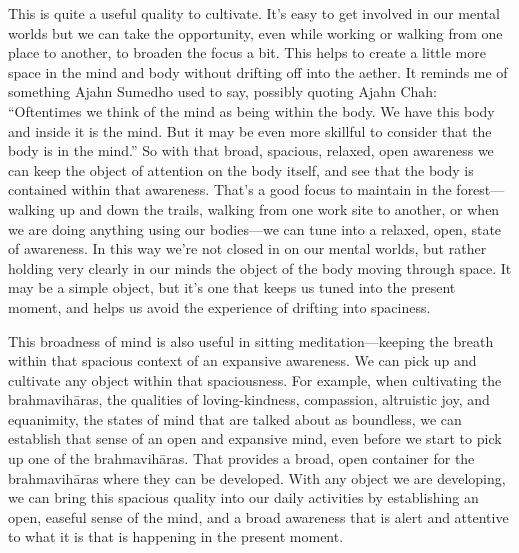 This is quite a useful quality to cultivate. It's easy to get involved 
in our mental worlds but we can take the opportunity, even while 
working or walking from one place to another, to broaden the focus a 
bit. This helps to create a little more space in the mind and body 
without drifting off into the aether. It reminds me of something Ajahn 
Sumedho used to say, possibly quoting Ajahn Chah: ``Oftentimes we think 
of the mind as being within the body. We have this body and inside it 
is the mind. But it may be even more skillful to consider that the body 
is in the mind.'' So with that broad, spacious, relaxed, open awareness 
we can keep the object of attention on the body itself, and see that 
the body is contained within that awareness. That's a good focus to 
maintain in the forest---walking up and down the trails, walking from 
one work site to another, or when we are doing anything using our 
bodies---we can tune into a relaxed, open, state of awareness. In this 
way we're not closed in on our mental worlds, but rather holding very 
clearly in our minds the object of the body moving through space. It 
may be a simple object, but it's one that keeps us tuned into the 
present moment, and helps us avoid the experience of drifting into 
spaciness.

This broadness of mind is also useful in sitting meditation---keeping 
the breath within that spacious context of an expansive awareness. We 
can pick up and cultivate any object within that spaciousness. For 
example, when cultivating the brahmavihāras, the qualities of 
loving-kindness, compassion, altruistic joy, and equanimity, the states 
of mind that are talked about as boundless, we can establish that sense 
of an open and expansive mind, even before we start to pick up one of 
the brahmavihāras. That provides a broad, open container for the 
brahmavihāras where they can be developed. With any object we are 
developing, we can bring this spacious quality into our daily 
activities by establishing an open, easeful sense of the mind, and a 
broad awareness that is alert and attentive to what it is that is 
happening in the present moment.



